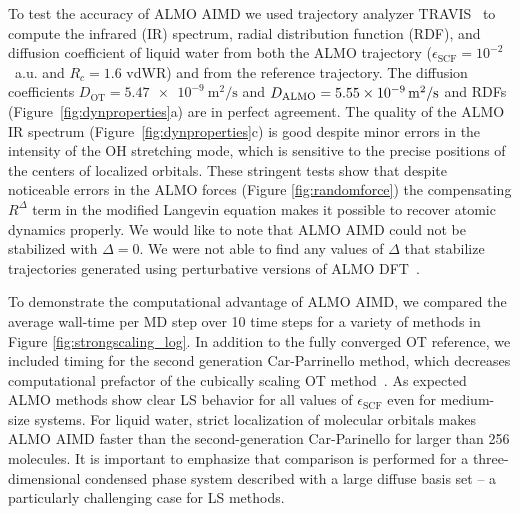 \documentclass[aps,prl,reprint,amsmath,amssymb]{revtex4-1}
\begin{document}
To test the accuracy of ALMO AIMD we used trajectory analyzer TRAVIS~\cite{a:travis-main} to compute the infrared (IR) spectrum, radial distribution function (RDF), and diffusion coefficient of liquid water from both the ALMO trajectory ($\epsilon_{\text{SCF}} = 10^{-2}$~a.u. and $R_{c} = 1.6$ vdWR) and from the reference trajectory.  
The diffusion coefficients $D_{\text{OT}}=\SI{5.47e-9}{\m^{2}\per\s}$ and $D_{\text{ALMO}}=\SI{5.55E-09}{\m^{2}\per\s}$ and RDFs (Figure~\ref{fig:dynproperties}a) are in perfect agreement. The quality of the ALMO IR spectrum (Figure~\ref{fig:dynproperties}c) is good despite minor errors in the intensity of the OH stretching mode, which is sensitive to the precise positions of the centers of localized orbitals. These stringent tests show that despite noticeable errors in the ALMO forces (Figure \ref{fig:randomforce}) the compensating $R^{\Delta}$ term in the modified Langevin equation makes it possible to recover atomic dynamics properly. We would like to note that ALMO AIMD could not be stabilized with $\Delta=0$. We were not able to find any values of $\Delta$ that stabilize trajectories generated using perturbative versions of ALMO DFT~\cite{a:almo-ls}.



To demonstrate the computational advantage of ALMO AIMD, we compared the average wall-time per MD step over 10 time steps for a variety of methods in Figure \ref{fig:strongscaling_log}.
In addition to the fully converged OT reference, we included timing for the second generation Car-Parrinello method, which decreases computational prefactor of the cubically scaling OT method~\cite{a:2ndcpmd}.
As expected ALMO methods show clear LS behavior for all values of $\epsilon_{\text{SCF}}$ even for medium-size systems. 
For liquid water, strict localization of molecular orbitals makes ALMO AIMD faster than the second-generation Car-Parinello for larger than 256 molecules. It is important to emphasize that comparison is performed for a three-dimensional condensed phase system described with a large diffuse basis set -- a particularly challenging case for LS methods.
\end{document}
